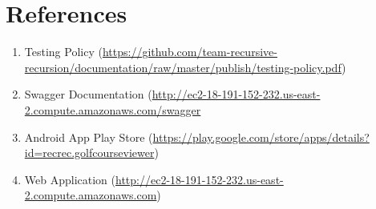 \documentclass{article}
\begin{document}
    \newpage

    \section{References}

    \begin{enumerate}
        \item Testing Policy
        (\url{https://github.com/team-recursive-recursion/documentation/raw/master/publish/testing-policy.pdf})
		\item Swagger Documentation
		(\url{http://ec2-18-191-152-232.us-east-2.compute.amazonaws.com/swagger}
		\item Android App Play Store
		(\url{https://play.google.com/store/apps/details?id=recrec.golfcourseviewer})
		\item Web Application
		(\url{http://ec2-18-191-152-232.us-east-2.compute.amazonaws.com})
    \end{enumerate}
\end{document}
